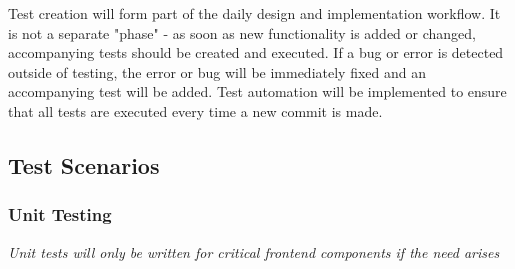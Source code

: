\documentclass{article}
\begin{document}
	Test creation will form part of the daily design and implementation workflow. It is not a separate "phase" - as soon as new functionality is added or changed, accompanying tests should be created and executed. If a bug or error is detected outside of testing, the error or bug will be immediately fixed and an accompanying test will be added. Test automation will be implemented to ensure that all tests are executed every time a new commit is made. 
		
	\subsection{Test Scenarios}
		\subsubsection{Unit Testing}
			\textit{Unit tests will only be written for critical frontend components if the need arises}
\end{document}
